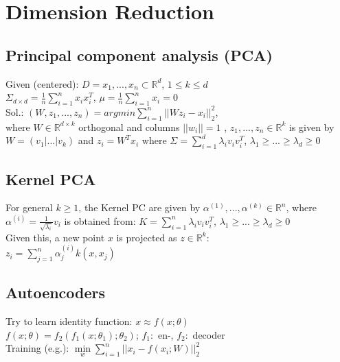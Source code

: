 \section*{Dimension Reduction}
\subsection*{Principal component analysis (PCA)}
Given (centered): $D={x_1,...,x_n} \subset \mathbb{R}^d$, $1\leq k \leq d$\\
$\Sigma_{d \times d} = \frac{1}{n}\sum_{i=1}^n x_i x_i^T$, $\mu =\frac{1}{n}\sum_{i = 1}^n x_i = 0$\\
Sol.:
$(W,z_1,...,z_n) = argmin \sum_{i=1}^n||W z_i - x_i||_2^2$,\\
where $W \in \mathbb{R}^{d \times k}$ orthogonal and columns $||w_i||=1$ , $z_1,...,z_n\in\mathbb{R}^k$ is given by $W = (v_1|...|v_k)$ and $z_i = W^T x_i$ where $\Sigma = \sum_{i=1}^d \lambda_i v_i v_i^T$, $\lambda_1 \geq ... \geq \lambda_d \geq 0$

\subsection*{Kernel PCA}
For general $k\geq1$, the Kernel PC are given by $\alpha^{(1)},...,\alpha^{(k)}\in \mathbb{R}^n$, where $\alpha^{(i)} = \frac{1}{\sqrt{\lambda_i}}v_i$ is obtained from: $K = \sum_{i=1}^n \lambda_i v_i v_i^T$, $\lambda_1 \geq ... \geq \lambda_d \geq 0$\\
Given this, a new point $x$ is projected as $z \in \mathbb{R}^k$:\\
$z_i = \sum_{j=1}^n\alpha_j^{(i)}k(x,x_j)$

\subsection*{Autoencoders}
Try to learn identity function: $x \approx f(x;\theta)$\\
$f(x;\theta) = f_2(f_1(x;\theta_1);\theta_2)$; $f_1:$ en-, $f_2:$ decoder\\
Training (e.g.): $ \underset{w}{\operatorname{min}}\sum_{i=1}^n||x_i-f(x_i;W)||_2^2$